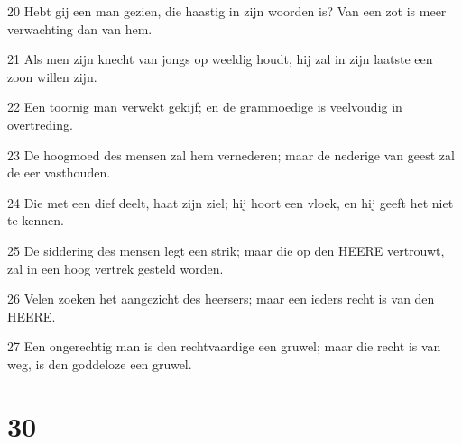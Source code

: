 \par 20 Hebt gij een man gezien, die haastig in zijn woorden is? Van een zot is meer verwachting dan van hem.
\par 21 Als men zijn knecht van jongs op weeldig houdt, hij zal in zijn laatste een zoon willen zijn.
\par 22 Een toornig man verwekt gekijf; en de grammoedige is veelvoudig in overtreding.
\par 23 De hoogmoed des mensen zal hem vernederen; maar de nederige van geest zal de eer vasthouden.
\par 24 Die met een dief deelt, haat zijn ziel; hij hoort een vloek, en hij geeft het niet te kennen.
\par 25 De siddering des mensen legt een strik; maar die op den HEERE vertrouwt, zal in een hoog vertrek gesteld worden.
\par 26 Velen zoeken het aangezicht des heersers; maar een ieders recht is van den HEERE.
\par 27 Een ongerechtig man is den rechtvaardige een gruwel; maar die recht is van weg, is den goddeloze een gruwel.

\chapter{30}

